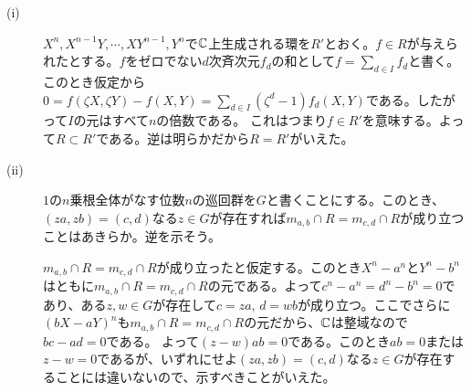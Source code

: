 \newpage

\begin{sol} ${}$
  \begin{description}
    \item[(i)] $X^n, X^{n-1}Y , \cdots , XY^{n-1}, Y^n$で${\mathbb C}$上生成される環を$R'$とおく。$f \in R$が与えられたとする。$f$をゼロでない$d$次斉次元$f_d$の和として$f = \sum_{d \in I} f_d$と書く。このとき仮定から$0 = f(\zeta X,\zeta Y) - f(X,Y) = \sum_{d \in I} (\zeta^d - 1) f_d(X,Y) $である。したがって$I$の元はすべて$n$の倍数である。
    これはつまり$f \in R'$を意味する。よって$R \subset R'$である。逆は明らかだから$R = R'$がいえた。
    \item[(ii)] $1$の$n$乗根全体がなす位数$n$の巡回群を$G$と書くことにする。このとき、$(z a, z b) = (c,d)$なる$z \in G$が存在すれば$m_{a,b} \cap R = m_{c,d} \cap R$が成り立つことはあきらか。逆を示そう。

    $m_{a,b} \cap R = m_{c,d} \cap R$が成り立ったと仮定する。このとき$X^n - a^n$と$Y^n - b^n$はともに$m_{a,b} \cap R = m_{c,d} \cap R$の元である。よって$c^n - a^n = d^n -b^n = 0$であり、ある$z,w \in G$が存在して$c = za$, $d = wb$が成り立つ。ここでさらに$(bX - aY)^n$も$m_{a,b} \cap R = m_{c,d} \cap R$の元だから、${\mathbb C}$は整域なので$bc - ad=0$である。
    よって$(z - w)ab=0$である。このとき$ab=0$または$z-w=0$であるが、いずれにせよ$(z a, z b) = (c,d)$なる$z \in G$が存在することには違いないので、示すべきことがいえた。
  \end{description}
\end{sol}
